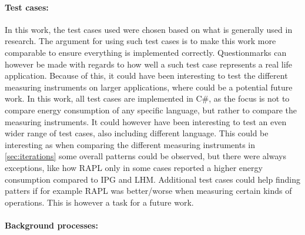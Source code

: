\paragraph*{Test cases:} In this work, the test cases used were chosen based on what is generally used in research\cite*[]{Koedijk2022diff, greenland2016statistical}. The argument for using such test cases is to make this work more comparable to ensure everything is implemented correctly. Questionmarks can however be made with regards to how well a such test case represents a real life application. Because of this, it could have been interesting to test the different measuring instruments on larger applications, where could be a potential future work. In this work, all test cases are implemented in C\#, as the focus is not to compare energy consumption of any specific language, but rather to compare the measuring instruments. It could however have been interesting to test an even wider range of test cases, also including different language. This could be interesting as when comparing the different measuring instruments in \cref*{sec:iterations} some overall patterns could be observed, but there were always exceptions, like how RAPL only in some cases reported a higher energy consumption compared to IPG and LHM. Additional test cases could help finding patters if for example RAPL was better/worse when measuring certain kinds of operations. This is however a task for a future work.  

\paragraph*{Background processes:}